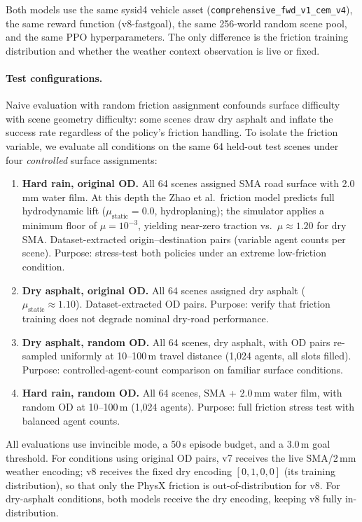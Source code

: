 Both models use the same sysid4 vehicle asset (\texttt{comprehensive\_fwd\_v1\_cem\_v4}), the same reward function (v8-fastgoal), the same 256-world random scene pool, and the same PPO hyperparameters.
The only difference is the friction training distribution and whether the weather context observation is live or fixed.

\paragraph{Test configurations.}
Naive evaluation with random friction assignment confounds surface difficulty with scene geometry difficulty: some scenes draw dry asphalt and inflate the success rate regardless of the policy's friction handling.
To isolate the friction variable, we evaluate all conditions on the same 64 held-out test scenes under four \emph{controlled} surface assignments:

\begin{enumerate}[leftmargin=*, itemsep=1pt]
  \item \textbf{Hard rain, original OD.}
        All 64 scenes assigned SMA road surface with 2.0\,mm water film.
        At this depth the Zhao et al.\ friction model predicts full hydrodynamic lift ($\mu_\text{static} = 0.0$, hydroplaning); the simulator applies a minimum floor of $\mu = 10^{-3}$, yielding near-zero traction vs.\ $\mu \approx 1.20$ for dry SMA.
        Dataset-extracted origin--destination pairs (variable agent counts per scene).
        Purpose: stress-test both policies under an extreme low-friction condition.
  \item \textbf{Dry asphalt, original OD.}
        All 64 scenes assigned dry asphalt ($\mu_\text{static} \approx 1.10$).
        Dataset-extracted OD pairs.
        Purpose: verify that friction training does not degrade nominal dry-road performance.
  \item \textbf{Dry asphalt, random OD.}
        All 64 scenes, dry asphalt, with OD pairs re-sampled uniformly at 10--100\,m travel distance (1{,}024 agents, all slots filled).
        Purpose: controlled-agent-count comparison on familiar surface conditions.
  \item \textbf{Hard rain, random OD.}
        All 64 scenes, SMA + 2.0\,mm water film, with random OD at 10--100\,m (1{,}024 agents).
        Purpose: full friction stress test with balanced agent counts.
\end{enumerate}

All evaluations use invincible mode, a 50\,s episode budget, and a 3.0\,m goal threshold.
For conditions using original OD pairs, v7 receives the live SMA/2\,mm weather encoding; v8 receives the fixed dry encoding $[0,1,0,0]$ (its training distribution), so that only the PhysX friction is out-of-distribution for v8.
For dry-asphalt conditions, both models receive the dry encoding, keeping v8 fully in-distribution.

